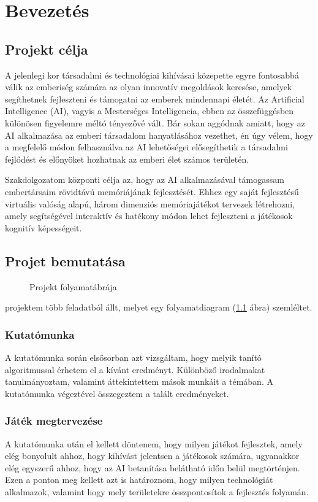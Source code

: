 \chapter{Bevezetés}
\usetikzlibrary{shapes,arrows}

\thispagestyle{fancy}
\pagestyle{fancy}
\section{Projekt célja}
A jelenlegi kor társadalmi és technológiai kihívásai közepette egyre fontosabbá válik az emberiség számára az olyan innovatív megoldások keresése, amelyek segíthetnek fejleszteni és támogatni az emberek mindennapi életét. Az Artificial Intelligence (AI), vagyis a Mesterséges Intelligencia, ebben az összefüggésben különösen figyelemre méltó tényezővé vált. Bár sokan aggódnak amiatt, hogy az AI alkalmazása az emberi társadalom hanyatlásához vezethet, én úgy vélem, hogy a megfelelő módon felhasználva az AI lehetőségei elősegíthetik a társadalmi fejlődést és előnyöket hozhatnak az emberi élet számos területén.

Szakdolgozatom központi célja az, hogy az AI alkalmazásával támogassam embertársaim rövidtávú memóriájának fejlesztését. Ehhez egy saját fejlesztésű virtuális valóság alapú, három dimenziós memóriajátékot tervezek létrehozni, amely segítségével interaktív és hatékony módon lehet fejleszteni a játékosok kognitív képességeit. 
\section{Projet bemutatása}
\begin{figure}
    \centering
    
    \caption{Projekt folyamatábrája}
    \label{fig:folyamat_diagram}
\end{figure}
projektem több feladatból állt, melyet egy folyamatdiagram (\ref{fig:folyamat_diagram} ábra) szemléltet.

\subsection{Kutatómunka}
A kutatómunka során elsősorban azt vizsgáltam, hogy melyik tanító algoritmussal érhetem el a kívánt eredményt. Különböző irodalmakat tanulmányoztam, valamint áttekintettem mások munkáit a témában. A kutatómunka végeztével összegeztem a talált eredményeket.

\subsection{Játék megtervezése}
A kutatómunka után el kellett döntenem, hogy milyen játékot fejlesztek, amely elég bonyolult ahhoz, hogy kihívást jelentsen a játékosok számára, ugyanakkor elég egyszerű ahhoz, hogy az AI betanítása belátható időn belül megtörténjen. Ezen a ponton meg kellett azt is határoznom, hogy milyen technológiát alkalmazok, valamint hogy mely területekre összpontosítok a fejlesztés folyamán.

